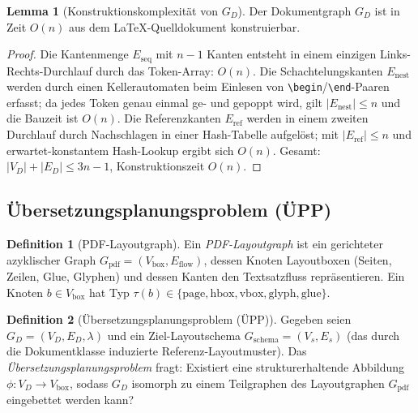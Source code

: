 ﻿\documentclass[a4paper,12pt]{article}
\theoremstyle{definition}
\newtheorem{definition}{Definition}
\newtheorem{lemma}{Lemma}
\begin{document}
\begin{lemma}[Konstruktionskomplexität von $G_D$]
	\label{lem:ltx-graph-konstruktion}
	Der Dokumentgraph $G_D$ ist in Zeit $O(n)$ aus dem \LaTeX-Quelldokument
	konstruierbar.
\end{lemma}

\begin{proof}
	Die Kantenmenge $E_{\mathrm{seq}}$ mit $n-1$ Kanten entsteht in einem
	einzigen Links-Rechts-Durchlauf durch das Token-Array: $O(n)$.
	Die Schachtelungskanten $E_{\mathrm{nest}}$ werden durch einen Kellerautomaten
	beim Einlesen von \texttt{\textbackslash begin}/\texttt{\textbackslash end}-Paaren
	erfasst; da jedes Token genau einmal ge- und ge\-poppt wird, gilt
	$|E_{\mathrm{nest}}| \le n$ und die Bauzeit ist $O(n)$.
	Die Referenzkanten $E_{\mathrm{ref}}$ werden in einem zweiten Durchlauf
	durch Nachschlagen in einer Hash-Tabelle aufgelöst; mit
	$|E_{\mathrm{ref}}| \le n$ und erwartet-konstantem Hash-Lookup ergibt
	sich $O(n)$.
	Gesamt: $|V_D| + |E_D| \le 3n - 1$, Konstruktionszeit $O(n)$.
\end{proof}

\subsection{Übersetzungsplanungsproblem (ÜPP)}
\label{sec:ltx-upp}

\begin{definition}[PDF-Layoutgraph]
	\label{def:ltx-layout}
	Ein \emph{PDF-Layoutgraph} ist ein gerichteter azyklischer Graph
	$G_{\mathrm{pdf}} = (V_{\mathrm{box}}, E_{\mathrm{flow}})$, dessen Knoten
	Layoutboxen (Seiten, Zeilen, Glue, Glyphen) und dessen Kanten den
	Textsatzfluss repräsentieren. Ein Knoten $b \in V_{\mathrm{box}}$ hat
	Typ $\tau(b) \in \{\mathrm{page}, \mathrm{hbox}, \mathrm{vbox},
	\mathrm{glyph}, \mathrm{glue}\}$.
\end{definition}

\begin{definition}[Übersetzungsplanungsproblem (ÜPP)]
	\label{def:ltx-upp}
	Gegeben seien $G_D = (V_D, E_D, \lambda)$ und ein Ziel-Layoutschema
	$G_{\mathrm{schema}} = (V_s, E_s)$ (das durch die Dokumentklasse induzierte
	Referenz-Layoutmuster). Das \emph{Übersetzungsplanungsproblem} fragt:
	Existiert eine strukturerhaltende Abbildung
	$\phi: V_D \to V_{\mathrm{box}}$,
	sodass $G_D$ isomorph zu einem Teilgraphen des Layoutgraphen
	$G_{\mathrm{pdf}}$ eingebettet werden kann?
\end{definition}
\end{document}

